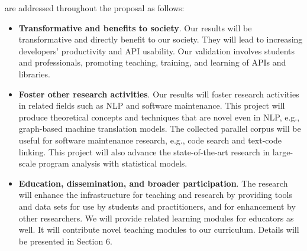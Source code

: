  are addressed throughout the
proposal as follows:

\begin{itemize}

  \item {\bf Transformative and benefits to society}. Our 
    results will be transformative and directly benefit to our
    society.  They will lead to increasing developers' productivity
    and API usability. Our validation involves students and
    professionals, promoting teaching, training, and learning of APIs
    and libraries.


  \item {\bf Foster other research activities}. Our results will
    foster research activities in related fields such as NLP and
    software maintenance. This project will produce theoretical
    concepts and techniques that are novel even in NLP, e.g.,
    graph-based machine translation models. The collected parallel
    corpus will be useful for software maintenance research, e.g.,
    code search and text-code linking. This project will also advance
    the state-of-the-art research in large-scale program analysis with
    statistical models.



  \item {\bf Education, dissemination, and broader participation}.
  The research will enhance the infrastructure for teaching and
  research by providing tools and data sets for use by students and
  practitioners, and for enhancement by other researchers. We will
  provide related learning modules for educators as well. It will
  contribute novel teaching modules to our curriculum. Details will be
  presented in Section 6.


\end{itemize}
